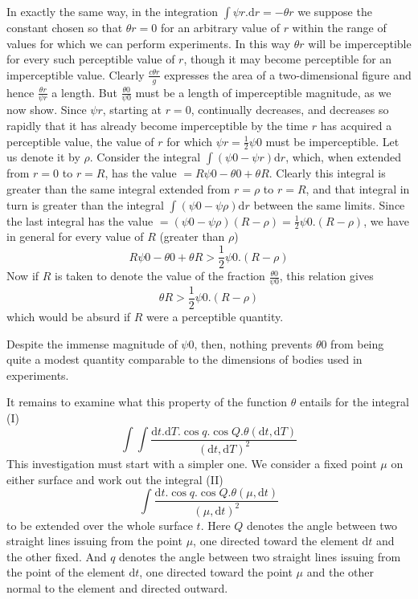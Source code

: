 In exactly the same way, in the integration $\int\psi r.\mathrm{d}r=-\theta r$ we suppose the constant chosen so that $\theta r=0$ for an arbitrary value of $r$ within the range of values for which we can perform experiments. In this way $\theta r$ will be imperceptible for every such perceptible value of $r$, though it may become perceptible for an imperceptible value. Clearly $\frac{c\theta r}{g}$ expresses the area of a two-dimensional figure and hence $\frac{\theta r}{\psi r}$ a length. But $\frac{\theta0}{\psi0}$ must be a length of imperceptible magnitude, as we now show. Since $\psi r$, starting at $r=0$, continually decreases, and decreases so rapidly that it has already become imperceptible by the time $r$ has acquired a perceptible value, the value of $r$ for which $\psi r=\frac12\psi0$ must be imperceptible. Let us denote it by $\rho$. Consider the integral $\int(\psi0-\psi r)\mathrm{d}r$, which, when extended from $r=0$ to $r=R$, has the value $=R\psi0-\theta0+\theta R$. Clearly this integral is greater than the same integral extended from $r=\rho$ to $r=R$, and that integral in turn is greater than the integral $\int(\psi0-\psi\rho)\mathrm{d}r$ between the same limits. Since the last integral has the value $=(\psi0-\psi\rho)(R-\rho)=\frac12\psi0.(R-\rho)$, we have in general for every value of $R$ (greater than $\rho$)
\[
R\psi0-\theta0+\theta R>\frac12\psi0.(R-\rho)
\]
Now if $R$ is taken to denote the value of the fraction $\frac{\theta0}{\psi0}$, this relation gives
\[
\theta R>\frac12\psi0.(R-\rho)
\]
which would be absurd if $R$ were a perceptible quantity.

Despite the immense magnitude of $\psi0$, then, nothing prevents $\theta0$ from being quite a modest quantity comparable to the dimensions of bodies used in experiments.

It remains to examine what this property of the function $\theta$ entails for the integral (I)
\[
\int\int\frac{\mathrm{d}t.\mathrm{d}T.\cos q.\cos Q.\theta(\mathrm{d}t,\mathrm{d}T)}{(\mathrm{d}t,\mathrm{d}T)^2}
\]
This investigation must start with a simpler one. We consider a fixed point $\mu$ on either surface and work out the integral (II)
\[
\int\frac{\mathrm{d}t.\cos q.\cos Q.\theta(\mu,\mathrm{d}t)}{(\mu,\mathrm{d}t)^2}
\]
to be extended over the whole surface $t$. Here $Q$ denotes the angle between two straight lines issuing from the point $\mu$, one directed toward the element $\mathrm{d}t$ and the other fixed. And $q$ denotes the angle between two straight lines issuing from the point of the element $\mathrm{d}t$, one directed toward the point $\mu$ and the other normal to the element and directed outward.

